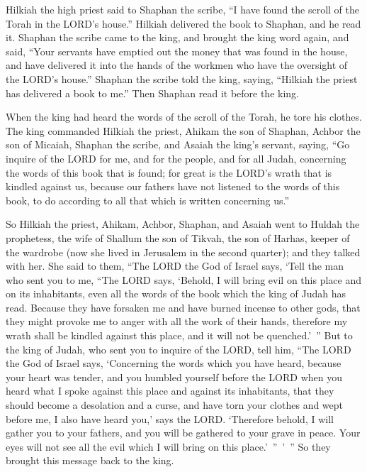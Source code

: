 \myverse{}Hilkiah the high priest said to Shaphan the scribe, “I have found
the scroll of the Torah in the LORD’s house.” Hilkiah delivered the book to Shaphan, and he read it.
\myverse{}Shaphan the scribe came to the king, and brought the king word again, and said,
“Your servants have emptied out the money that was found in the house, and have delivered it into the
hands of the workmen who have the oversight of the LORD’s house.”
\myverse{}Shaphan the scribe told the king, saying, “Hilkiah the priest has delivered
a book to me.” Then Shaphan read it before the king.

\myverse{}When the king had heard the words of the scroll of the Torah,
he tore his clothes.
\myverse{}The king commanded Hilkiah the priest, Ahikam the son of Shaphan, Achbor
the son of Micaiah, Shaphan the scribe, and Asaiah the king’s servant, saying,
\myverse{}“Go inquire of the LORD for me, and for the people, and for all Judah, concerning
the words of this book that is found; for great is the LORD’s wrath that is kindled against us, because
our fathers have not listened to the words of this book, to do according to all that which is written
concerning us.”

\myverse{}So Hilkiah the priest, Ahikam, Achbor, Shaphan, and Asaiah went
to Huldah the prophetess, the wife of Shallum the son of Tikvah, the son of Harhas, keeper of the wardrobe
(now she lived in Jerusalem in the second quarter); and they talked with her.
\myverse{}She said to them, “The LORD the God of Israel says, ‘Tell the man who sent
you to me,
\myverse{}“The LORD says, ‘Behold, I will bring evil on this place and on its inhabitants,
even all the words of the book which the king of Judah has read.
\myverse{}Because they have forsaken me and have burned incense to other gods, that
they might provoke me to anger with all the work of their hands, therefore my wrath shall be kindled against
this place, and it will not be quenched.’ ”
\myverse{}But to the king of Judah, who sent you to inquire of the LORD, tell him,
“The LORD the God of Israel says, ‘Concerning the words which you have heard,
\myverse{}because your heart was tender, and you humbled yourself before the LORD when
you heard what I spoke against this place and against its inhabitants, that they should become a desolation
and a curse, and have torn your clothes and wept before me, I also have heard you,’ says the LORD.
\myverse{}‘Therefore behold, I will gather you to your fathers, and you will be gathered
to your grave in peace. Your eyes will not see all the evil which I will bring on this place.’ ” ’ ” So they
brought this message back to the king.



